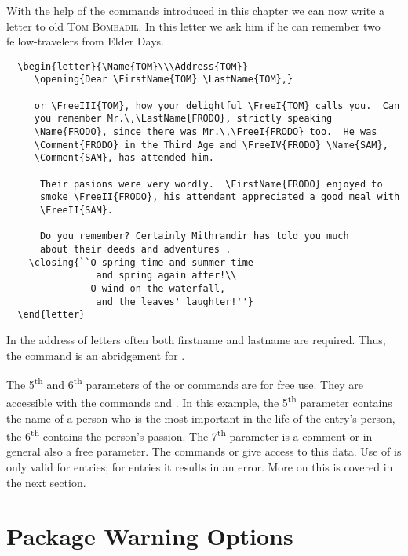 With the help of the commands introduced in this chapter we can now
write a letter to old \textsc{Tom Bombadil}.  In this letter we ask
him if he can remember two fellow-travelers from Elder Days.
\begin{lstlisting}
  \begin{letter}{\Name{TOM}\\\Address{TOM}}
     \opening{Dear \FirstName{TOM} \LastName{TOM},}
     
     or \FreeIII{TOM}, how your delightful \FreeI{TOM} calls you.  Can
     you remember Mr.\,\LastName{FRODO}, strictly speaking
     \Name{FRODO}, since there was Mr.\,\FreeI{FRODO} too.  He was
     \Comment{FRODO} in the Third Age and \FreeIV{FRODO} \Name{SAM},
     \Comment{SAM}, has attended him.
      
      Their pasions were very wordly.  \FirstName{FRODO} enjoyed to
      smoke \FreeII{FRODO}, his attendant appreciated a good meal with
      \FreeII{SAM}.

      Do you remember? Certainly Mithrandir has told you much
      about their deeds and adventures .
    \closing{``O spring-time and summer-time
                and spring again after!\\
               O wind on the waterfall,
                and the leaves' laughter!''}
  \end{letter}
\end{lstlisting}
In the address of letters often both firstname and lastname are
required.  Thus, the command  is an
abridgement for 
.

The 5\textsuperscript{th} and 6\textsuperscript{th} parameters of the
 or  commands are for free use.  They
are accessible with the commands  and .  In
this example, the 5\textsuperscript{th} parameter contains the name of
a person who is the most important in the life of the entry's person,
the 6\textsuperscript{th} contains the person's passion.  The
7\textsuperscript{th} parameter is a comment or in general also a free
parameter. The commands  or  give access
to this data. Use of  is only valid for
 entries; for  entries it results in
an error. More on this is covered in the next section.

\section{Package Warning Options}


